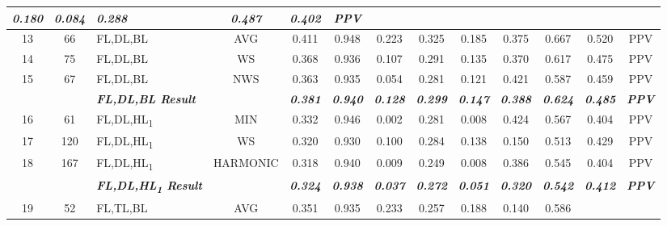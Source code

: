 \begin{table}[H]
{\begin{tabular}{cc|l|c|c|c|c|c|c|c|c|c|c|}
    \textit{\textbf{0.180}} &
    \textit{\textbf{0.084}} &
    \textit{\textbf{0.288}} &
    \textit{\textbf{0.487}} &
    \textit{\textbf{0.402}} &
    \textit{\textbf{PPV}} \\ \hline
  \multicolumn{1}{|c|}{13} &
    66 &
    FL,DL,BL &
    AVG &
    0.411 &
    0.948 &
    0.223 &
    0.325 &
    0.185 &
    0.375 &
    0.667 &
    0.520 &
    PPV \\ \hline
  \multicolumn{1}{|c|}{14} &
    75 &
    FL,DL,BL &
    WS &
    0.368 &
    0.936 &
    0.107 &
    0.291 &
    0.135 &
    0.370 &
    0.617 &
    0.475 &
    PPV \\ \hline
  \multicolumn{1}{|c|}{15} &
    67 &
    FL,DL,BL &
    NWS &
    0.363 &
    0.935 &
    0.054 &
    0.281 &
    0.121 &
    0.421 &
    0.587 &
    0.459 &
    PPV \\ \hline
  \textit{\textbf{}} &
    \textit{\textbf{}} &
    \textit{\textbf{FL,DL,BL Result}} &
    \textit{\textbf{}} &
    \textit{\textbf{0.381}} &
    \textit{\textbf{0.940}} &
    \textit{\textbf{0.128}} &
    \textit{\textbf{0.299}} &
    \textit{\textbf{0.147}} &
    \textit{\textbf{0.388}} &
    \textit{\textbf{0.624}} &
    \textit{\textbf{0.485}} &
    \textit{\textbf{PPV}} \\ \hline
  \multicolumn{1}{|c|}{16} &
    61 &
    FL,DL,HL\textsubscript{1} &
    MIN &
    0.332 &
    0.946 &
    0.002 &
    0.281 &
    0.008 &
    0.424 &
    0.567 &
    0.404 &
    PPV \\ \hline
  \multicolumn{1}{|c|}{17} &
    120 &
    FL,DL,HL\textsubscript{1} &
    WS &
    0.320 &
    0.930 &
    0.100 &
    0.284 &
    0.138 &
    0.150 &
    0.513 &
    0.429 &
    PPV \\ \hline
  \multicolumn{1}{|c|}{18} &
    167 &
    FL,DL,HL\textsubscript{1} &
    HARMONIC &
    0.318 &
    0.940 &
    0.009 &
    0.249 &
    0.008 &
    0.386 &
    0.545 &
    0.404 &
    PPV \\ \hline
  \textit{\textbf{}} &
    \textit{\textbf{}} &
    \textit{\textbf{FL,DL,HL\textsubscript{1} Result}} &
    \textit{\textbf{}} &
    \textit{\textbf{0.324}} &
    \textit{\textbf{0.938}} &
    \textit{\textbf{0.037}} &
    \textit{\textbf{0.272}} &
    \textit{\textbf{0.051}} &
    \textit{\textbf{0.320}} &
    \textit{\textbf{0.542}} &
    \textit{\textbf{0.412}} &
    \textit{\textbf{PPV}} \\ \hline
  \multicolumn{1}{|c|}{19} &
    52 &
    FL,TL,BL &
    AVG &
    0.351 &
    0.935 &
    0.233 &
    0.257 &
    0.188 &
    0.140 &
    0.586 &

\end{tabular}}
\end{table}
